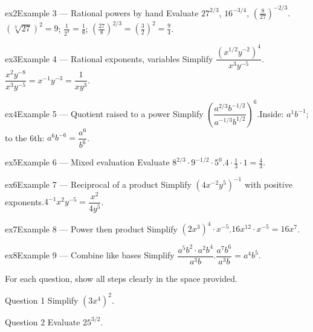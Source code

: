 \documentclass[11pt]{article}
\begin{document}
\begin{example}{ex2}{Example 3 --- Rational powers by hand}
Evaluate $27^{2/3}$, $16^{-3/4}$, $\left(\tfrac{8}{27}\right)^{-2/3}$.\soln $(\sqrt[3]{27})^2=9$; $\tfrac{1}{2^3}=\tfrac18$; $\left(\tfrac{27}{8}\right)^{2/3}=\left(\tfrac32\right)^2=\tfrac94$.
\end{example}

\begin{example}{ex3}{Example 4 --- Rational exponents, variables}
Simplify $\dfrac{(x^{1/2}y^{-2})^4}{x^3y^{-5}}$.\soln $\dfrac{x^2y^{-8}}{x^3y^{-5}}=x^{-1}y^{-3}=\dfrac{1}{xy^3}$.
\end{example}

\begin{example}{ex4}{Example 5 --- Quotient raised to a power}
Simplify $\left(\dfrac{a^{2/3}b^{-1/2}}{a^{-1/3}b^{1/2}}\right)^{6}$.\soln Inside: $a^{1}b^{-1}$; to the 6th: $a^6b^{-6}=\dfrac{a^6}{b^6}$.
\end{example}

\begin{example}{ex5}{Example 6 --- Mixed evaluation}
Evaluate $8^{2/3}\cdot 9^{-1/2}\cdot 5^{0}$.\soln $4\cdot\tfrac13\cdot1=\tfrac43$.
\end{example}

\begin{example}{ex6}{Example 7 --- Reciprocal of a product}
Simplify $(4x^{-2}y^5)^{-1}$ with positive exponents.\soln $4^{-1}x^2y^{-5}=\dfrac{x^2}{4y^5}$.
\end{example}

\begin{example}{ex7}{Example 8 --- Power then product}
Simplify $(2x^3)^4\cdot x^{-5}$.\soln $16x^{12}\cdot x^{-5}=16x^7$.
\end{example}

\begin{example}{ex8}{Example 9 --- Combine like bases}
Simplify $\dfrac{a^5b^2\cdot a^2b^4}{a^3b}$.\soln $\dfrac{a^7b^6}{a^3b}=a^4b^5$.
\end{example}

\clearpage
{}
For each question, show all steps clearly in the space provided.

\begin{qbox}{Question 1}
Simplify $(3x^4)^2$.\workspace{2.4cm}
\end{qbox}

\begin{qbox}{Question 2}
Evaluate $25^{3/2}$.\workspace{2.4cm}
\end{qbox}
\end{document}
